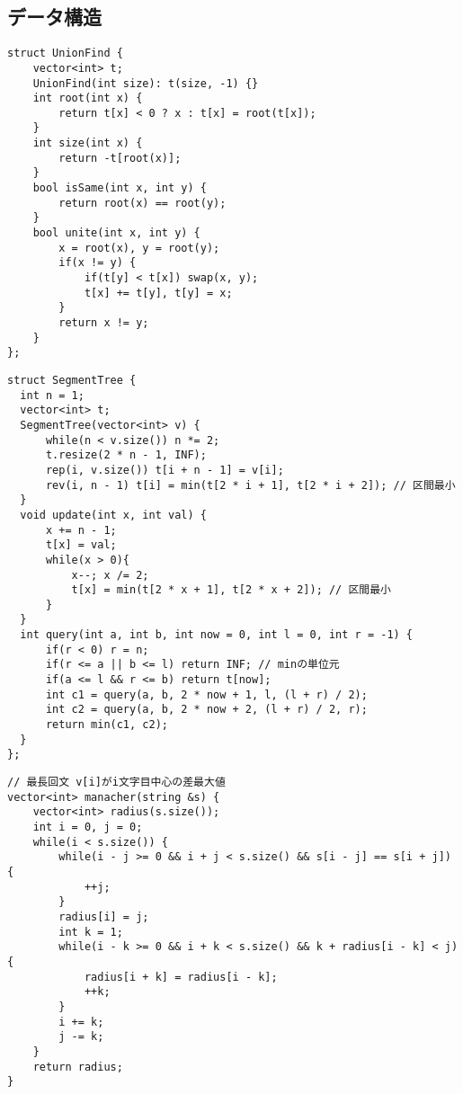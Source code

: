 \documentclass{jsarticle}
\begin{document}
\subsection*{データ構造}
\begin{lstlisting}[caption=UnionFind]
struct UnionFind {
    vector<int> t;
    UnionFind(int size): t(size, -1) {}
    int root(int x) {
        return t[x] < 0 ? x : t[x] = root(t[x]);
    }
    int size(int x) {
        return -t[root(x)];
    }
    bool isSame(int x, int y) {
        return root(x) == root(y);
    }
    bool unite(int x, int y) {
        x = root(x), y = root(y);
        if(x != y) {
            if(t[y] < t[x]) swap(x, y);
            t[x] += t[y], t[y] = x;
        }
        return x != y;
    }
};
\end{lstlisting}
\begin{lstlisting}[caption=セグ木]
struct SegmentTree {
  int n = 1;
  vector<int> t;
  SegmentTree(vector<int> v) {
      while(n < v.size()) n *= 2;
      t.resize(2 * n - 1, INF);
      rep(i, v.size()) t[i + n - 1] = v[i];
      rev(i, n - 1) t[i] = min(t[2 * i + 1], t[2 * i + 2]); // 区間最小
  }
  void update(int x, int val) {
      x += n - 1;
      t[x] = val;
      while(x > 0){
          x--; x /= 2;
          t[x] = min(t[2 * x + 1], t[2 * x + 2]); // 区間最小
      }
  }
  int query(int a, int b, int now = 0, int l = 0, int r = -1) {
      if(r < 0) r = n;
      if(r <= a || b <= l) return INF; // minの単位元
      if(a <= l && r <= b) return t[now];
      int c1 = query(a, b, 2 * now + 1, l, (l + r) / 2);
      int c2 = query(a, b, 2 * now + 2, (l + r) / 2, r);
      return min(c1, c2);
  }
};
\end{lstlisting}
\begin{lstlisting}[caption=回文]
// 最長回文 v[i]がi文字目中心の差最大値
vector<int> manacher(string &s) {
    vector<int> radius(s.size());
    int i = 0, j = 0;
    while(i < s.size()) {
        while(i - j >= 0 && i + j < s.size() && s[i - j] == s[i + j]) {
            ++j;
        }
        radius[i] = j;
        int k = 1;
        while(i - k >= 0 && i + k < s.size() && k + radius[i - k] < j) {
            radius[i + k] = radius[i - k];
            ++k;
        }
        i += k;
        j -= k;
    }
    return radius;
}
\end{lstlisting}
\end{document}
